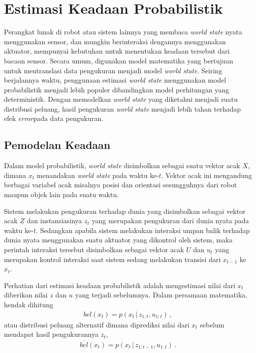 \section{Estimasi Keadaan Probabilistik}

Perangkat lunak di robot atau sistem lainnya yang membaca \textit{world state} nyata menggunakan sensor, dan mungkin berinteraksi dengannya menggunakan aktuator, mempunyai kebutuhan untuk menentukan keadaan tersebut dari bacaan sensor. Secara umum, digunakan model matematika yang bertujuan untuk mentranslasi data pengukuran menjadi model \textit{world state}. Seiring berjalannya waktu, penggunaan estimasi \textit{world state} menggunakan model probabilistik menjadi lebih populer dibandingkan model perhitungan yang deterministik. Dengan memodelkan \textit{world state} yang diketahui menjadi suatu distribusi peluang, hasil pengukuran \textit{world state} menjadi lebih tahan terhadap efek \textit{error}pada data pengukuran. \citep{thrun2010}

\subsection{Pemodelan Keadaan}

Dalam model probabilistik, \textit{world state} disimbolkan sebagai suatu vektor acak $X$, dimana $x_t$ menandakan \textit{world state} pada waktu ke-$t$. Vektor acak ini mengandung berbagai variabel acak misalnya posisi dan orientasi sesungguhnya dari robot maupun objek lain pada suatu waktu.

Sistem melakukan pengukuran terhadap dunia yang disimbolkan sebagai vektor acak $Z$ dan instansiasinya $z_t$ yang merupakan pengukuran dari dunia nyata pada waktu ke-$t$. Sedangkan apabila sistem melakukan interaksi umpan balik terhadap dunia nyata menggunakan suatu aktuator yang dikontrol oleh sistem, maka perintah interaksi tersebut disimbolkan sebagai vektor acak $U$ dan $u_t$ yang merupakan kontrol interaksi saat sistem sedang melakukan transisi dari $x_{t-1}$ ke $x_t$.

Perhatian dari estimasi keadaan probabilistik adalah mengestimasi nilai dari $x_t$ diberikan nilai $z$ dan $u$ yang terjadi sebelumnya. Dalam persamaan matematika, hendak dihitung
\begin{align}
    bel(x_t) = p(x_t \,|\, z_{1:t}, u_{1:t}) \,,
\end{align}
atau distribusi peluang alternatif dimana diprediksi nilai dari $x_t$ sebelum mendapat hasil pengukurannya $z_t$,
\begin{align}
    \overline{bel}(x_t) = p(x_t \,|\, z_{1:t-1}, u_{1:t}) \,.
\end{align}

